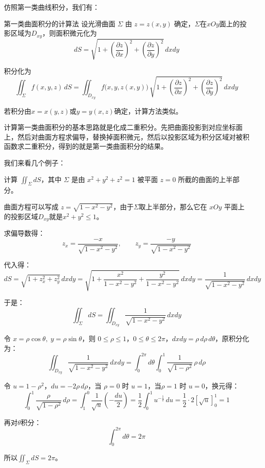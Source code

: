 仿照第一类曲线积分，我们有：
\begin{theorem}{第一类曲面积分的计算法}{}
    设光滑曲面 $\Sigma$ 由 $z = z(x,y)$ 确定，$\Sigma$在$xOy$面上的投影区域为$D_{xy}$，则面积微元化为
\[
dS = \sqrt{1 + \left(\frac{\partial z}{\partial x}\right)^2 + \left(\frac{\partial z}{\partial y}\right)^2}\,dxdy
\]

积分化为
\[
\iint_{\Sigma} f(x,y,z)\,dS
= \iint_{D_{xy}} f\big(x,y,z(x,y)\big)\,
\sqrt{1 + \left(\frac{\partial z}{\partial x}\right)^2 + \left(\frac{\partial z}{\partial y}\right)^2}\,dxdy
\]

若积分由$x = x(y,z)$或$y = y(x,z)$确定，计算方法类似。
\end{theorem}

计算第一类曲面积分的基本思路就是化成二重积分。先把曲面投影到对应坐标面上，然后对曲面方程求偏导，替换掉面积微元，然后以投影区域为积分区域对被积函数求二重积分，得到的就是第一类曲面积分的结果。

我们来看几个例子：

\begin{myexample}
计算 \(\iint_{\Sigma} dS\)，其中 \(\Sigma\) 是由 \(x^2+y^2+z^2=1\) 被平面 \(z=0\) 所截的曲面的上半部分。

曲面方程可以写成 \(z=\sqrt{1-x^2-y^2}\)，由于\(\Sigma\)取上半部分，那么它在 \(xOy\) 平面上的投影区域\(D_{xy}\)就是\(x^2+y^2\le 1\)。

求偏导数得：
\[
z_x = \frac{-x}{\sqrt{1-x^2-y^2}},\qquad
z_y = \frac{-y}{\sqrt{1-x^2-y^2}}
\]

代入得：
\[
dS = \sqrt{1+z_x^2+z_y^2}\,dxdy
= \sqrt{1+\frac{x^2}{1-x^2-y^2}+\frac{y^2}{1-x^2-y^2}}\,dxdy
= \frac{1}{\sqrt{1-x^2-y^2}}\,dxdy
\]

于是：
\[
\iint_{\Sigma} dS = \iint_{D_{xy}} \frac{1}{\sqrt{1-x^2-y^2}}\,dxdy
\]

令 \(x=\rho\cos\theta,\; y=\rho\sin\theta\)，则 \(0\le \rho\le 1\)，\(0\le\theta\le2\pi\)，\(dxdy = \rho\,d\rho\,d\theta\)，原积分化为：
\[
\iint_{D_{xy}} \frac{1}{\sqrt{1-x^2-y^2}}\,dxdy = \int_0^{2\pi} d\theta \int_0^1 \frac{1}{\sqrt{1-\rho^2}}\,\rho\,d\rho
\]

令 \(u=1-\rho^2\)，\(du=-2\rho\,d\rho\)，当 \(\rho=0\) 时 \(u=1\)，当\(\rho=1\) 时 \(u=0\)，换元得：
\[
\int_0^1 \frac{\rho}{\sqrt{1-\rho^2}}\,d\rho = \int_1^0 \frac{1}{\sqrt{u}}\left(-\frac{du}{2}\right)
= \frac12\int_0^1 u^{-\frac12}\,du
= \frac12\cdot 2[\sqrt{u}]_0^1 = 1
\]

再对\(\theta\)积分：
\[\int_0^{2\pi} d\theta=2\pi\]

所以\(\iint_{\Sigma} dS = 2\pi\)。
\end{myexample}

